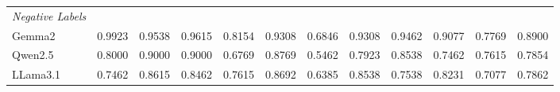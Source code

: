 \begin{table}
{\begin{tabular}{lcccccccccc||c}
            \hline
            \textit{Negative Labels}           &                                                         &                                                         &                                                         &                                                                   &                                                          &                                                           &                                                                  &                                                         &                                        &                                          &       \\
            Gemma2                             & 0.9923                                                  & 0.9538                                                  & 0.9615                                                  & 0.8154                                                            & 0.9308                                                  & 0.6846                                                    & 0.9308                                                            & 0.9462                                                  & 0.9077                                 & 0.7769                                   & 0.8900 \\
            Qwen2.5                            & 0.8000                                                  & 0.9000                                                  & 0.9000                                                  & 0.6769                                                            & 0.8769                                                  & 0.5462                                                    & 0.7923                                                            & 0.8538                                                  & 0.7462                                 & 0.7615                                   & 0.7854 \\
            LLama3.1                           & 0.7462                                                  & 0.8615                                                  & 0.8462                                                  & 0.7615                                                            & 0.8692                                                  & 0.6385                                                    & 0.8538                                                            & 0.7538                                                  & 0.8231                                 & 0.7077                                   & 0.7862 \\

\end{tabular}}
\end{table}
